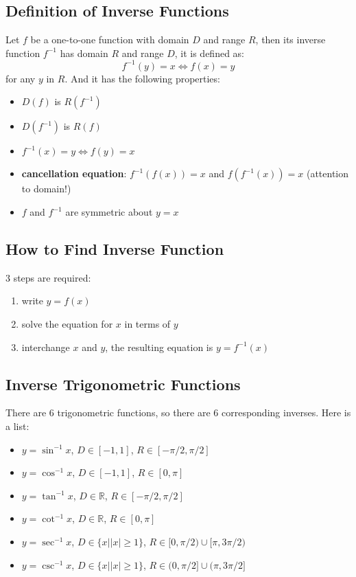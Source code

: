 \documentclass[10pt,a4paper,oneside]{article}
\begin{document}
\subsection{Definition of Inverse Functions}
Let $f$ be a one-to-one function with domain $D$ and range $R$, then its inverse function $f^{-1}$ has domain $R$ and range $D$, it is defined as:
\[
f^{-1}(y) = x \Leftrightarrow f(x) = y
\]
for any $y$ in $R$. And it has the following properties:
\begin{itemize}
	\item $D(f)$ is $R(f^{-1})$
	\item $D(f^{-1})$ is $R(f)$
	\item $f^{-1}(x) = y \Leftrightarrow f(y) = x$
	\item \textbf{cancellation equation}: $f^{-1}(f(x)) = x$ and $f(f^{-1}(x)) = x$ (attention to domain!)
	\item $f$ and $f^{-1}$ are symmetric about $y=x$
\end{itemize}

\subsection{How to Find Inverse Function}
$3$ steps are required:
\begin{enumerate}
	\item write $y = f(x)$
	\item solve the equation for $x$ in terms of $y$
	\item interchange $x$ and $y$, the resulting equation is $y = f^{-1}(x)$
\end{enumerate}

\subsection{Inverse Trigonometric Functions}
There are $6$ trigonometric functions, so there are $6$ corresponding inverses. Here is a list:
\begin{itemize}
	\item $y = \sin^{-1} x$, $D \in [-1, 1]$, $R \in [-\pi/2, \pi/2]$
	\item $y = \cos^{-1} x$, $D \in [-1, 1]$, $R \in [0, \pi]$
	\item $y = \tan^{-1} x$, $D \in \mathbb{R}$, $R \in [-\pi/2, \pi/2]$
	\item $y = \cot^{-1} x$, $D \in \mathbb{R}$, $R \in [0, \pi]$
	\item $y = \sec^{-1} x$, $D \in \{x | |x| \geq 1\}$, $R \in [0, \pi/2) \cup [\pi, 3\pi /2)$
	\item $y = \csc^{-1} x$, $D \in \{x | |x| \geq 1\}$, $R \in (0, \pi/2] \cup (\pi, 3\pi /2]$
\end{itemize}
\end{document}
